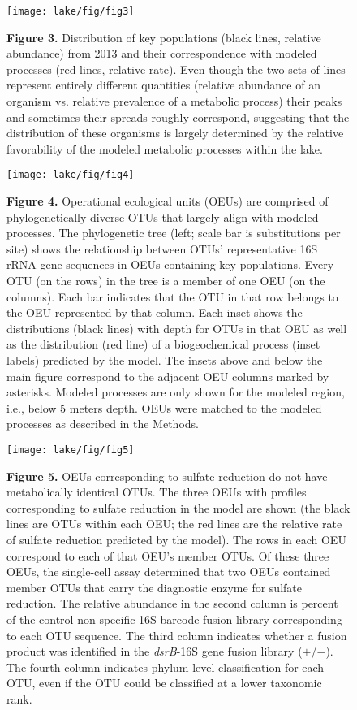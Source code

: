 \begin{figure}[ht]
\centering
\texttt{[image: lake/fig/fig3]}
\caption*{{\bf Figure 3.} Distribution of key populations (black lines,
relative abundance) from 2013 and their correspondence with modeled processes
(red lines, relative rate). Even though the two sets of lines represent
entirely different quantities (relative abundance of an organism vs. relative
prevalence of a metabolic process) their peaks and sometimes their spreads
roughly correspond, suggesting that the distribution of these organisms is
largely determined by the relative favorability of the modeled metabolic
processes within the lake.}
\end{figure}

\begin{figure}[ht]
\centering
\texttt{[image: lake/fig/fig4]}
\caption*{{\bf Figure 4.} Operational ecological units (OEUs) are comprised of
phylogenetically diverse OTUs that largely align with modeled processes. The
phylogenetic tree (left; scale bar is substitutions per site) shows the
relationship between OTUs' representative 16S rRNA gene sequences in OEUs
containing key populations. Every OTU (on the rows) in the tree is a member of
one OEU (on the columns). Each bar indicates that the OTU in that row belongs
to the OEU represented by that column. Each inset shows the distributions
(black lines) with depth for OTUs in that OEU as well as the distribution (red
line) of a biogeochemical process (inset labels) predicted by the model. The
insets above and below the main figure correspond to the adjacent OEU columns
marked by asterisks. Modeled processes are only shown for the modeled region,
i.e., below 5 meters depth. OEUs were matched to the modeled processes as
described in the Methods.}
\end{figure}

\begin{figure}[ht]
\centering
\texttt{[image: lake/fig/fig5]}
\caption*{{\bf Figure 5.} OEUs corresponding to sulfate reduction do not have
metabolically identical OTUs. The three OEUs with profiles corresponding to
sulfate reduction in the model are shown (the black lines are OTUs within each
OEU; the red lines are the relative rate of sulfate reduction predicted by the
model). The rows in each OEU correspond to each of that OEU's member OTUs. Of
these three OEUs, the single-cell assay determined that two OEUs contained
member OTUs that carry the diagnostic enzyme for sulfate reduction. The
relative abundance in the second column is percent of the control non-specific
16S-barcode fusion library corresponding to each OTU sequence. The third column
indicates whether a fusion product was identified in the \textit{dsrB}-16S gene fusion
library ($+$/$-$). The fourth column indicates phylum level classification for each
OTU, even if the OTU could be classified at a lower taxonomic rank.}
\end{figure}
